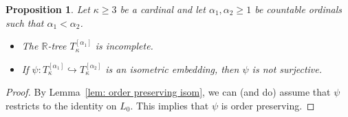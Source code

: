 \documentclass[11pt]{article}
\newtheorem{proposition}[theorem]{Proposition}
\theoremstyle{definition}
\theoremstyle{remark}
\begin{document}
\begin{proposition} \label{lem: no isometry}
    Let $\kappa \geq 3$ be a cardinal and let $\alpha_1, \alpha_2 \geq 1$ be countable ordinals such that $\alpha_1 < \alpha_2$.
    \begin{itemize} 
    	\item The $\mathbb{R}$-tree $T_\kappa^{[\alpha_1]}$ is incomplete.
    	\item If $\psi: T_\kappa^{[\alpha_1]} \hookrightarrow T_\kappa^{[\alpha_2]}$ is an isometric embedding, then $\psi$ is not surjective.
    \end{itemize}
\end{proposition}
\begin{proof}
	By Lemma~\ref{lem: order preserving isom}, we can (and do) assume that $\psi$ restricts to the identity on $L_0$. This implies that $\psi$ is order preserving.


\end{proof}
\end{document}
